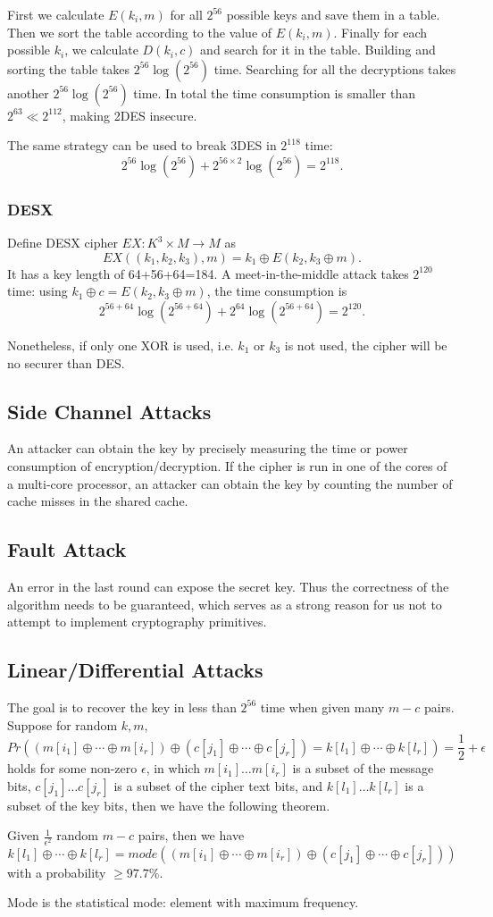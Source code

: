 First we calculate $E(k_i,m)$ for all $2^{56}$ possible keys and save them in a table. Then we sort the table according to the value of $E(k_i,m)$. Finally for each possible $k_i$, we calculate $D(k_i,c)$ and search for it in the table. Building and sorting the table takes $2^{56}\log(2^{56})$ time. Searching for all the decryptions takes another $2^{56}\log(2^{56})$ time. In total the time consumption is smaller than $2^{63}\ll 2^{112}$, making 2DES insecure.

The same strategy can be used to break 3DES in $2^{118}$ time:
\[2^{56}\log(2^{56})+2^{56\times 2}\log(2^{56})=2^{118}.\]
\subsubsection{DESX}
Define DESX cipher $EX:K^{3}\times M\rightarrow M$ as 
\[EX((k_1,k_2,k_3),m)=k_1\oplus E(k_2,k_3\oplus m).\]
It has a key length of 64+56+64=184. A meet-in-the-middle attack takes $2^{120}$ time: using $k_1\oplus c=E(k_2,k_3\oplus m)$, the time consumption is 
\[2^{56+64}\log(2^{56+64})+2^{64}\log(2^{56+64})=2^{120}.\]

Nonetheless, if only one XOR is used, i.e. $k_1$ or $k_3$ is not used, the cipher will be no securer than DES.
\subsection{Side Channel Attacks}
An attacker can obtain the key by precisely measuring the time or power consumption of encryption/decryption. If the cipher is run in one of the cores of a multi-core processor, an attacker can obtain the key by counting the number of cache misses in the shared cache. 
\subsection{Fault Attack}
An error in the last round can expose the secret key. Thus the correctness of the algorithm needs to be guaranteed, which serves as a strong reason for us not to attempt to implement cryptography primitives.
\subsection{Linear/Differential Attacks}
The goal is to recover the key in less than $2^{56}$ time when given many $m-c$ pairs. Suppose for random $k,m$, 
\[Pr((m[i_1]\oplus\cdots\oplus m[i_r])\oplus(c[j_1]\oplus\cdots\oplus c[j_r]) = k[l_1]\oplus\cdots\oplus k[l_r])=\frac{1}{2}+\epsilon\]
holds for some non-zero $\epsilon$, in which $m[i_1]\dots m[i_r]$ is a subset of the message bits, $c[j_1]\dots c[j_r]$ is a subset of the cipher text bits, and $k[l_1]\dots k[l_r]$ is a subset of the key bits, then we have the following theorem.
\begin{theorem}
Given $\frac{1}{\epsilon^2}$ random $m-c$ pairs, then we have
\[k[l_1]\oplus\cdots\oplus k[l_r]=mode((m[i_1]\oplus\cdots\oplus m[i_r])\oplus(c[j_1]\oplus\cdots\oplus c[j_r]))\]
with a probability $\geq 97.7\%$.
\end{theorem}
Mode is the statistical mode: element with maximum frequency. 

